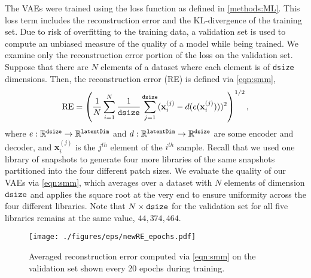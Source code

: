 \documentclass[final,3p]{elsarticle}
\theoremstyle{break}
\newcommand{\R}{\mathbb{R}}
\newcommand{\bb}[1]{\mathbf{#1}}
\begin{document}
The VAEs were trained using the loss function as defined in \cref{methods:ML}. 
This loss term includes the reconstruction error and the KL-divergence of the training set.
Due to risk of overfitting to the training data, a validation set is used to compute an unbiased measure of the quality of a model while being trained.
We examine only the reconstruction error portion of the loss on the validation set.
Suppose that there are $N$ elements of a dataset where each element is of {\tt dsize} dimensions. 
Then, the reconstruction error (RE) is defined via \cref{eqn:smm},
\begin{equation}
    \text{RE} = \left(\frac{1}{N}\sum_{i=1}^N\frac{1}{{\tt dsize}}\sum_{j=1}^{{\tt dsize}}(\bb{x}_i^{(j)}-d(e(\bb{x}_i^{(j)})))^2\right)^{1/2},
    \label{eqn:smm}
\end{equation}
where $e:\R^{{\tt dsize}}\rightarrow\R^{{\tt latentDim}}$ and $d:\R^{{\tt latentDim}}\rightarrow\R^{{\tt dsize}}$ are some encoder and decoder, and $\bb{x}_i^{(j)}$ is the $j^{th}$ element of the $i^{th}$ sample.
Recall that we used one library of snapshots to generate four more libraries of the same snapshots partitioned into the four different patch sizes.
We evaluate the quality of our VAEs via \cref{eqn:smm}, which averages over a dataset with $N$ elements of dimension ${\tt dsize}$ and applies the square root at the very end to ensure uniformity across the four different libraries.
Note that $N\times {\tt dsize}$ for the validation set for all five libraries remains at the same value, $44,374,464$.\par
\begin{figure}[t]
	\centering
	\texttt{[image: ./figures/eps/newRE\_epochs.pdf]}
	\caption{\label{fig:re_epochs} Averaged reconstruction error computed via \cref{eqn:smm} on the validation set shown every 20 epochs during training. }
\end{figure} 
\end{document}
